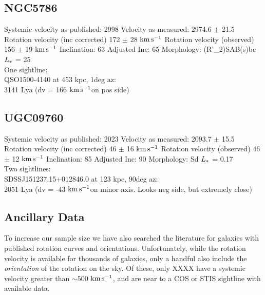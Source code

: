 \documentclass[iop]{emulateapj-rtx4}
\newcommand{\kms}{$\rm km\, s^{-1}$}
\begin{document}

%


\subsection{NGC5786}


Systemic velocity as published: 2998
Velocity as measured: 2974.6 $\pm$ 21.5
Rotation velocity (inc corrected) 172 $\pm$ 28 \kms
Rotation velocity (observed) 156 $\pm$ 19 \kms
Inclination: 63
Adjusted Inc: 65
Morphology: (R'\_2)SAB(s)bc
$L_{\**}$ = 25 \\

One sightline: \\
QSO1500-4140 at 453 kpc, 1deg az: \\
3141 Lya (dv = 166 \kms on pos side)


\subsection{UGC09760}
Systemic velocity as published: 2023
Velocity as measured: 2093.7 $\pm$ 15.5
Rotation velocity (inc corrected) 46 $\pm$ 16 \kms
Rotation velocity (observed) 46 $\pm$ 12 \kms
Inclination: 85
Adjusted Inc: 90
Morphology: Sd
$L_{\**}$ = 0.17 \\

Two sightlines: \\
SDSSJ151237.15+012846.0 at 123 kpc, 90deg az: \\
2051 Lya (dv = -43 \kms on minor axis. Looks neg side, but extremely close)



\subsection{Ancillary Data}
To increase our sample size we have also searched the literature for galaxies with published rotation curves and orientations. Unfortunately, while the rotation velocity is available for thousands of galaxies, only a handful also include the \emph{orientation} of the rotation on the sky. Of these, only XXXX have a systemic velocity greater than $\sim 500$ \kms, and are near to a COS or STIS sightline with available data.
\end{document}

